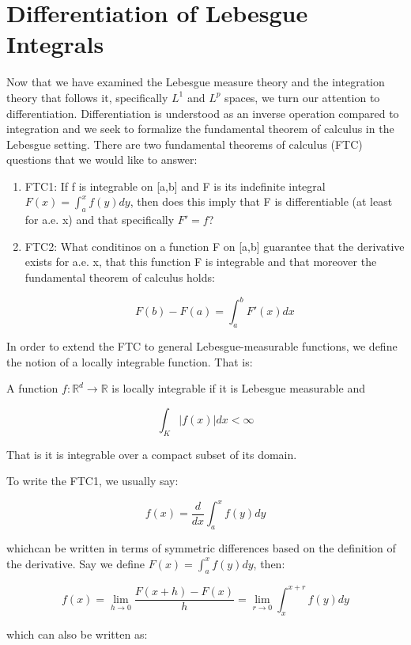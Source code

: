 \documentclass[class=article, crop=false]{standalone}
\begin{document}
\section{Differentiation of Lebesgue Integrals}
	Now that we have examined the Lebesgue measure theory and the integration theory that follows it, specifically $L^1$ and $L^p$ spaces, we turn our attention to differentiation. Differentiation is understood as an inverse operation compared to integration and we seek to formalize the fundamental theorem of calculus in the Lebesgue setting. There are two fundamental theorems of calculus (FTC) questions that we would like to answer:

	\begin{enumerate}
		\item FTC1: If f is integrable on [a,b] and F is its indefinite integral $F(x) = \int_a^x f(y) dy$, then does this imply that F is differentiable (at least for a.e. x) and that specifically $F' = f$?
		\item FTC2: What conditinos on a function F on [a,b] guarantee that the derivative exists for a.e. x, that this function F is integrable and that moreover the fundamental theorem of calculus holds:

			$$F(b) - F(a) = \int_a^b F'(x) dx$$
	\end{enumerate}

	In order to extend the FTC to general Lebesgue-measurable functions, we define the notion of a locally integrable function. That is:

	\begin{definition}
	\label{def:locally_integrable}
		A function $f : \mathbb{R}^d \rightarrow \mathbb{R}$ is locally integrable if it is Lebesgue measurable and

			$$\int_K |f(x)| dx < \infty$$

		That is it is integrable over a compact subset of its domain.
	\end{definition}

	To write the FTC1, we usually say:

		$$f(x) = \frac{d}{dx} \int_a^x f(y) dy$$

	whichcan be written in terms of symmetric differences based on the definition of the derivative. Say we define $F(x) = \int_a^x f(y) dy$, then:

		$$f(x) = \lim_{h \rightarrow 0} \frac{F(x+h) - F(x)}{h} = \lim_{r \rightarrow 0} \int_x^{x+r} f(y) dy$$

	which can also be written as:
\end{document}
